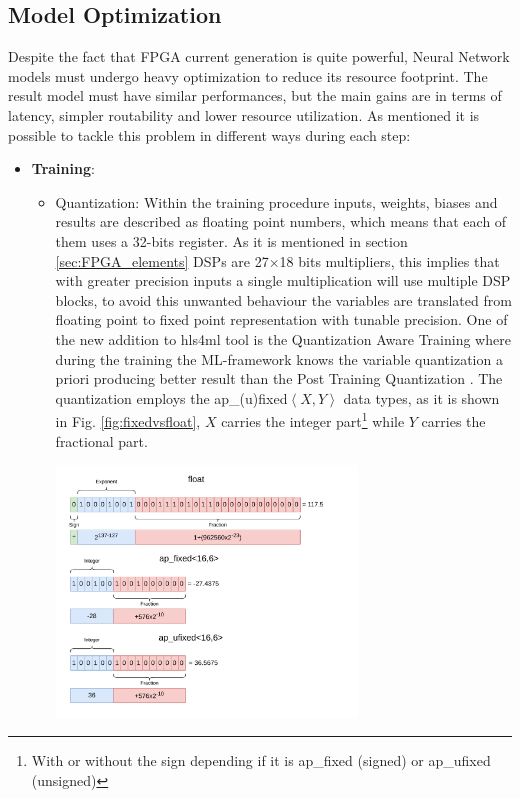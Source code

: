 \documentclass[../../main.tex]{subfiles}
\begin{document}
    
\subsection{Model Optimization}
\label{sec:FPGA_opt}
Despite the fact that FPGA current generation is quite powerful, Neural Network models must undergo heavy optimization to reduce its resource footprint. The result model must have similar performances, but the main gains are in terms of latency, simpler routability and lower resource utilization. As mentioned it is possible to tackle this problem in different ways during each step:  
\begin{itemize} 
    \item \textbf{Training}:
    \begin{itemize}
        \item Quantization: Within the training procedure inputs, weights, biases and results are described as floating point numbers, which means that each of them uses a 32-bits register. As it is mentioned in section \ref{sec:FPGA_elements} DSPs are 27$\times$18 bits multipliers, this implies that with greater precision inputs a single multiplication will use multiple DSP blocks, to avoid this unwanted behaviour the variables are translated from floating point to fixed point representation with tunable precision. One of the new addition to hls4ml tool is the Quantization Aware Training where during the training the ML-framework knows the variable quantization a priori producing better result than the Post Training Quantization \cite{qkeras}. The quantization employs the ap\_(u)fixed$\left<X,Y\right>$ data types, as it is shown in Fig. \ref{fig:fixedvsfloat}, $X$ carries the integer part\footnote{With or without the sign depending if it is ap\_fixed (signed) or ap\_ufixed (unsigned)} while $Y$ carries the fractional part.
        
        \begin{minipage}{\linewidth}
            \centering
            \includegraphics[width=8cm]{sections/04/Images/FPGA-data_format.pdf}
            \label{fig:fixedvsfloat}
        \end{minipage}
        

\end{itemize}
\end{itemize}
\end{document}
